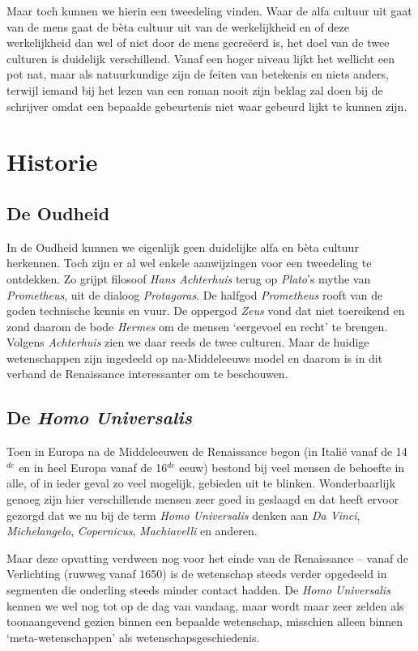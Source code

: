 Maar toch kunnen we hierin een tweedeling vinden. Waar de alfa cultuur uit gaat van de mens gaat de b\`eta cultuur uit van de werkelijkheid en of deze werkelijkheid dan wel of niet door de mens gecre\"eerd is, het doel van de twee culturen is duidelijk verschillend. Vanaf een hoger niveau lijkt het wellicht een pot nat, maar als natuurkundige zijn de feiten van betekenis en niets anders, terwijl iemand bij het lezen van een roman nooit zijn beklag zal doen bij de schrijver omdat een bepaalde gebeurtenis niet waar gebeurd lijkt te kunnen zijn.


\section{Historie}


\subsection{De Oudheid}

In de Oudheid kunnen we eigenlijk geen duidelijke alfa en b\`eta cultuur herkennen. Toch zijn er al wel enkele aanwijzingen voor een tweedeling te ontdekken. Zo grijpt filosoof \emph{Hans Achterhuis} terug op \emph{Plato}'s mythe van \emph{Prometheus}, uit de dialoog \emph{Protagoras}. De halfgod \emph{Prometheus} rooft van de goden technische kennis en vuur. De oppergod \emph{Zeus} vond dat niet toereikend en zond daarom de bode \emph{Hermes} om de mensen `eergevoel en recht' te brengen. Volgens \emph{Achterhuis} zien we daar reeds de twee culturen. Maar de huidige wetenschappen zijn ingedeeld op na-Middeleeuws model en daarom is in dit verband de Renaissance interessanter om te beschouwen.


\subsection{De \emph{Homo Universalis}}

Toen in Europa na de Middeleeuwen de Renaissance begon (in Itali\"e vanaf de 14$^{de}$ en in heel Europa vanaf de 16$^{de}$ eeuw) bestond bij veel mensen de behoefte in alle, of in ieder geval zo veel mogelijk, gebieden uit te blinken. Wonderbaarlijk genoeg zijn hier verschillende mensen zeer goed in geslaagd en dat heeft ervoor gezorgd dat we nu bij de term \emph{Homo Universalis} denken aan \emph{Da Vinci}, \emph{Michelangelo}, \emph{Copernicus}, \emph{Machiavelli} en anderen.

Maar deze opvatting verdween nog voor het einde van de Renaissance -- vanaf de Verlichting (ruwweg vanaf 1650) is de wetenschap steeds verder opgedeeld in segmenten die onderling steeds minder contact hadden. De \emph{Homo Universalis} kennen we wel nog tot op de dag van vandaag, maar wordt maar zeer zelden als toonaangevend gezien binnen een bepaalde wetenschap, misschien alleen binnen `meta-wetenschappen' als wetenschapsgeschiedenis.


